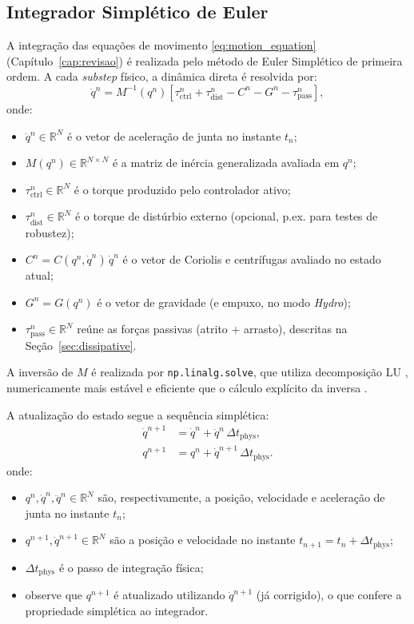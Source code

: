\subsection{Integrador Simplético de Euler}

A integração das equações de movimento \eqref{eq:motion_equation} (Capítulo~\ref{cap:revisao}) é realizada pelo método de Euler Simplético de primeira ordem. A cada \textit{substep} físico, a dinâmica direta é resolvida por:
\begin{equation}
    \ddot{q}^n = M^{-1}\!\left(q^n\right)\left[\tau^n_{\text{ctrl}} + \tau^n_{\text{dist}} - C^n - G^n - \tau^n_{\text{pass}}\right],
    \label{eq:dyn_direct}
\end{equation}
onde:
\begin{itemize}
    \item $\ddot{q}^n \in \mathbb{R}^N$ é o vetor de aceleração de junta no instante $t_n$;
    \item $M(q^n) \in \mathbb{R}^{N \times N}$ é a matriz de inércia generalizada avaliada em $q^n$;
    \item $\tau^n_{\text{ctrl}} \in \mathbb{R}^N$ é o torque produzido pelo controlador ativo;
    \item $\tau^n_{\text{dist}} \in \mathbb{R}^N$ é o torque de distúrbio externo (opcional, p.ex. para testes de robustez);
    \item $C^n = C(q^n, \dot{q}^n)\,\dot{q}^n$ é o vetor de Coriolis e centrífugas avaliado no estado atual;
    \item $G^n = G(q^n)$ é o vetor de gravidade (e empuxo, no modo \textit{Hydro});
    \item $\tau^n_{\text{pass}} \in \mathbb{R}^N$ reúne as forças passivas (atrito + arrasto), descritas na Seção~\ref{sec:dissipative}.
\end{itemize} A inversão de $M$ é realizada por \texttt{np.linalg.solve}, que utiliza decomposição LU , numericamente mais estável e eficiente que o cálculo explícito da inversa \cite{golub2013matrix}.

A atualização do estado segue a sequência simplética:
\begin{align}
    \dot{q}^{n+1} &= \dot{q}^n + \ddot{q}^n\,\Delta t_{\text{phys}}, \label{eq:symplectic1}\\
    q^{n+1} &= q^n + \dot{q}^{n+1}\,\Delta t_{\text{phys}}. \label{eq:symplectic2}
\end{align}
onde:
\begin{itemize}
    \item $q^n, \dot{q}^n, \ddot{q}^n \in \mathbb{R}^N$ são, respectivamente, a posição, velocidade e aceleração de junta no instante $t_n$;
    \item $q^{n+1}, \dot{q}^{n+1} \in \mathbb{R}^N$ são a posição e velocidade no instante $t_{n+1} = t_n + \Delta t_{\text{phys}}$;
    \item $\Delta t_{\text{phys}}$ é o passo de integração física;
    \item observe que $q^{n+1}$ é atualizado utilizando $\dot{q}^{n+1}$ (já corrigido), o que confere a propriedade simplética ao integrador.
\end{itemize}

